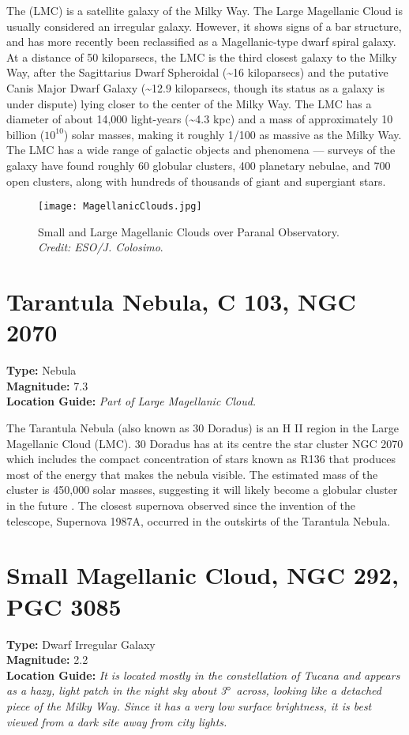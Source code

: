 The  (LMC) is a satellite galaxy of
the Milky Way. The Large Magellanic Cloud is usually considered an
irregular galaxy. However, it shows signs of a bar structure, and has more recently
been reclassified as a Magellanic-type dwarf spiral galaxy. At a
distance of 50 kiloparsecs, the LMC is the third closest galaxy to the
Milky Way, after the Sagittarius Dwarf Spheroidal (\textasciitilde16
kiloparsecs) and the putative Canis Major Dwarf Galaxy
(\textasciitilde12.9 kiloparsecs, though its status as a galaxy is
under dispute) lying closer to the center of the Milky Way. The LMC
has a diameter of about 14,000 light-years (\textasciitilde4.3 kpc)
and a mass of approximately 10 billion ($10^{10}$) solar
masses, making it roughly 1/100 as massive as the Milky Way. The LMC
has a wide range of galactic objects and phenomena --- surveys of the
galaxy have found roughly 60 globular clusters, 400 planetary nebulae,
and 700 open clusters, along with hundreds of thousands of giant and
supergiant stars.

\begin{figure}[ht]
\texttt{[image: MagellanicClouds.jpg]}
\caption{Small and Large Magellanic Clouds over Paranal Observatory. \emph{Credit: ESO/J. Colosimo}.}
\label{fig:MagellanicClouds}
\end{figure}

\section{Tarantula Nebula, C 103, NGC 2070}
\textbf{Type:} Nebula \\
\textbf{Magnitude:} 7.3 \\ 
\textbf{Location Guide:} \textit{Part of Large Magellanic Cloud.}

The Tarantula Nebula (also known as 30 Doradus) is an H II region in
the Large Magellanic Cloud (LMC). 30 Doradus has at its centre the
star cluster NGC 2070 which includes the compact concentration of
stars known as R136 that produces most of the energy that makes the
nebula visible. The estimated mass of the cluster is 450,000 solar
masses, suggesting it will likely become a globular cluster in the
future \citep{2009AJ....137.3437B}. The closest supernova observed
since the invention of the telescope, Supernova 1987A, occurred in the
outskirts of the Tarantula Nebula.

\section{Small Magellanic Cloud, NGC 292, PGC 3085}
\textbf{Type:} Dwarf Irregular Galaxy \\
\textbf{Magnitude:} 2.2 \\
\textbf{Location Guide:} \textit{It is located mostly in the
  constellation of Tucana and appears as a hazy, light patch in the
  night sky about 3$\degree$ across, looking like a detached piece of
  the Milky Way. Since it has a very low surface brightness, it is
  best viewed from a dark site away from city lights.}

